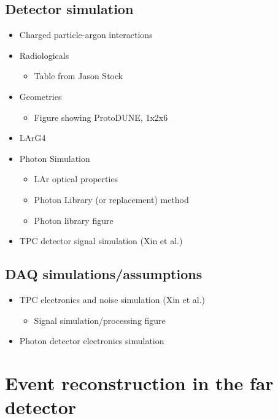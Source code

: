 \subsection{Detector simulation}
\label{sec:tools-mc-detsim}

\begin{itemize}
\item Charged particle-argon interactions
\item Radiologicals
\begin{itemize} \item Table from Jason Stock \end{itemize}
\item Geometries
\begin{itemize} \item Figure showing ProtoDUNE, 1x2x6 \end{itemize}
\item LArG4
\item Photon Simulation
\begin{itemize}
\item LAr optical properties
\item Photon Library (or replacement) method
\item Photon library figure
\end{itemize}
\item TPC detector signal simulation (Xin et al.)
\end{itemize}


\subsection{DAQ simulations/assumptions}
\label{sec:tools-mc-daq}

\begin{itemize}
\item TPC electronics and noise simulation (Xin et al.) 
\begin{itemize} \item Signal simulation/processing figure \end{itemize}
\item Photon detector electronics simulation
\end{itemize}


\section{Event reconstruction in the far detector}
\label{sec:tools-fdreco}

